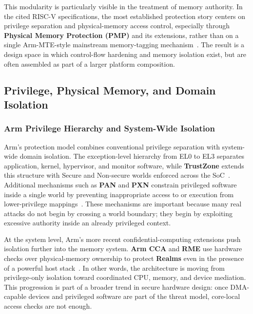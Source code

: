 This modularity is particularly visible in the treatment of memory authority. In the cited RISC-V specifications, the most established protection story centers on privilege separation and physical-memory access control, especially through \textbf{Physical Memory Protection (PMP)} and its extensions, rather than on a single Arm-MTE-style mainstream memory-tagging mechanism~\cite{riscv_privileged}. The result is a design space in which control-flow hardening and memory isolation exist, but are often assembled as part of a larger platform composition.

\subsection{Privilege, Physical Memory, and Domain Isolation}

\subsubsection{Arm Privilege Hierarchy and System-Wide Isolation}

Arm's protection model combines conventional privilege separation with system-wide domain isolation. The exception-level hierarchy from EL0 to EL3 separates application, kernel, hypervisor, and monitor software, while \textbf{TrustZone} extends this structure with Secure and Non-secure worlds enforced across the SoC~\cite{arm_trustzone_whitepaper,pinto2019trustzone,armv-a}. Additional mechanisms such as \textbf{PAN} and \textbf{PXN} constrain privileged software inside a single world by preventing inappropriate access to or execution from lower-privilege mappings~\cite{armv-a}. These mechanisms are important because many real attacks do not begin by crossing a world boundary; they begin by exploiting excessive authority inside an already privileged context.

At the system level, Arm's more recent confidential-computing extensions push isolation further into the memory system. \textbf{Arm CCA} and \textbf{RME} use hardware checks over physical-memory ownership to protect \textbf{Realms} even in the presence of a powerful host stack~\cite{li2022cca,arm_cca_spec,arm_rme_spec}. In other words, the architecture is moving from privilege-only isolation toward coordinated CPU, memory, and device mediation. This progression is part of a broader trend in secure hardware design: once DMA-capable devices and privileged software are part of the threat model, core-local access checks are not enough.

